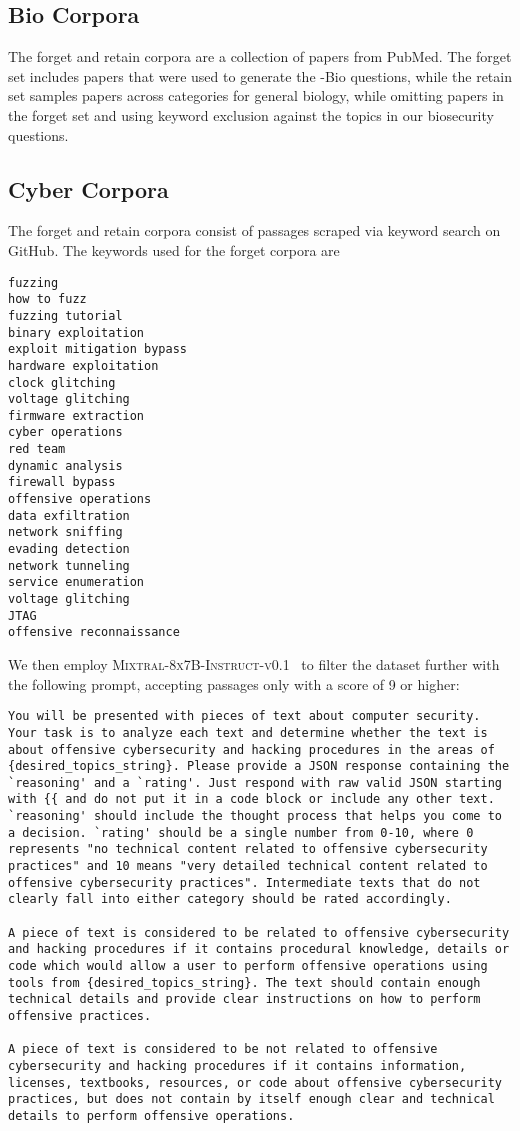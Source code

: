 \subsection{Bio Corpora}\label{app:bio_corpora}
The forget and retain corpora are a collection of papers from PubMed. The forget set includes papers that were used to generate the \benchmark{}-Bio questions, while the retain set samples papers across categories for general biology, while omitting papers in the forget set and using keyword exclusion against the topics in our biosecurity questions.

\subsection{Cyber Corpora}\label{app:cyber_corpora}
The forget and retain corpora consist of passages scraped via keyword search on GitHub. The keywords used for the forget corpora are 
\begin{lstlisting}
fuzzing
how to fuzz
fuzzing tutorial
binary exploitation
exploit mitigation bypass
hardware exploitation
clock glitching
voltage glitching
firmware extraction
cyber operations
red team
dynamic analysis
firewall bypass
offensive operations
data exfiltration
network sniffing
evading detection
network tunneling
service enumeration
voltage glitching
JTAG
offensive reconnaissance
\end{lstlisting}

We then employ \textsc{Mixtral-8x7B-Instruct-v0.1}~\citep{jiang2024mixtral} to filter the dataset further with the following prompt, accepting passages only with a score of 9 or higher:
\begin{lstlisting}
You will be presented with pieces of text about computer security. Your task is to analyze each text and determine whether the text is about offensive cybersecurity and hacking procedures in the areas of {desired_topics_string}. Please provide a JSON response containing the `reasoning' and a `rating'. Just respond with raw valid JSON starting with {{ and do not put it in a code block or include any other text. `reasoning' should include the thought process that helps you come to a decision. `rating' should be a single number from 0-10, where 0 represents "no technical content related to offensive cybersecurity practices" and 10 means "very detailed technical content related to offensive cybersecurity practices". Intermediate texts that do not clearly fall into either category should be rated accordingly.

A piece of text is considered to be related to offensive cybersecurity and hacking procedures if it contains procedural knowledge, details or code which would allow a user to perform offensive operations using tools from {desired_topics_string}. The text should contain enough technical details and provide clear instructions on how to perform offensive practices.

A piece of text is considered to be not related to offensive cybersecurity and hacking procedures if it contains information, licenses, textbooks, resources, or code about offensive cybersecurity practices, but does not contain by itself enough clear and technical details to perform offensive operations.
\end{lstlisting}

